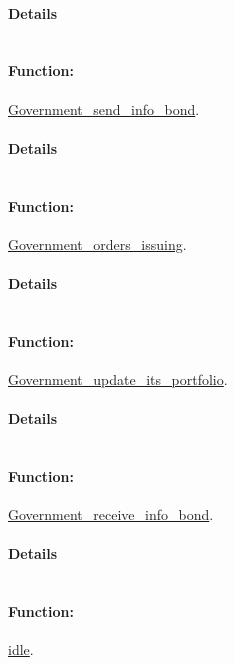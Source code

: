 \documentclass[a4paper,11pt]{article}
\begin{document}
\paragraph{Details}
\begin{verbatim}
\end{verbatim}
\paragraph{Function:}\url{Government_send_info_bond}.

\paragraph{Details}
\begin{verbatim}
\end{verbatim}
\paragraph{Function:}\url{Government_orders_issuing}.

\paragraph{Details}
\begin{verbatim}
\end{verbatim}
\paragraph{Function:}\url{Government_update_its_portfolio}.

\paragraph{Details}
\begin{verbatim}
\end{verbatim}
\paragraph{Function:}\url{Government_receive_info_bond}.

\paragraph{Details}
\begin{verbatim}
\end{verbatim}
\paragraph{Function:}\url{idle}.
\end{document}
